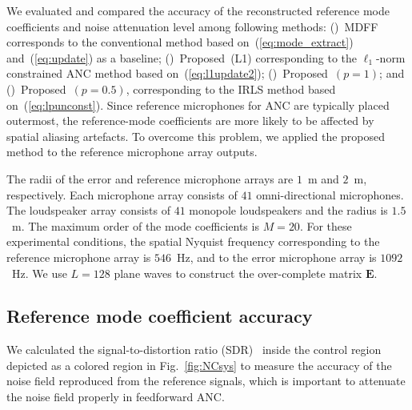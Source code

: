 \documentclass{article}
\def\rnum#1{\expandafter{\romannumeral #1}}
\begin{document}
%
%

We evaluated and compared the accuracy
of the reconstructed reference mode coefficients
and noise attenuation level among following methods:
(\rnum{1})~MDFF corresponds to the conventional method based on~(\ref{eq:mode_extract})
and~(\ref{eq:update}) as a baseline;
(\rnum{2})~Proposed~(L1) corresponding to the $\ell_1$-norm constrained ANC method
based on~(\ref{eq:l1update2});
(\rnum{3})~Proposed~$(p=1)$; and (\rnum{4})~Proposed~$(p=0.5)$, corresponding to the IRLS method
based on~(\ref{eq:lpunconst}).
Since reference microphones for ANC are typically placed outermost,
the reference-mode coefficients are more likely to be affected by spatial aliasing artefacts.
To overcome this problem, we applied the proposed method to the reference microphone array outputs.

The radii of the error and reference microphone arrays are $1$~m and $2$~m, respectively. Each microphone array consists of $41$ omni-directional microphones. The loudspeaker array consists of $41$ monopole loudspeakers and the radius is $1.5$~m.
The maximum order of the mode coefficients is $M=20$. For these experimental conditions, the spatial Nyquist frequency corresponding to
the reference microphone array is $546$~Hz, and to the error microphone array is $1092$~Hz.
We use $L=128$ plane waves to construct the over-complete matrix $\bm{E}$.

\subsection{Reference mode coefficient accuracy}
%
We calculated the signal-to-distortion ratio (SDR)~\cite{koyama2014sparse}
inside the control region depicted as a colored region
in Fig.~\ref{fig:NCsys} to measure the accuracy of
the noise field reproduced from the reference signals,
which is important to attenuate the noise field properly in feedforward ANC.
%
%
\end{document}
